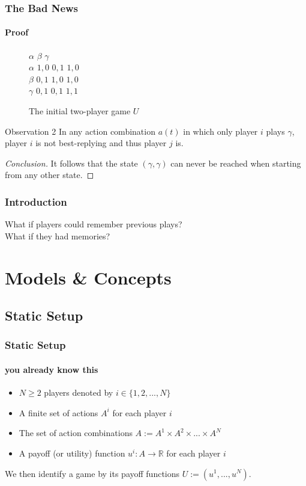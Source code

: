 \documentclass{beamer}
\begin{document}
\begin{frame}
    \frametitle{The Bad News}
    \framesubtitle{Proof}
    \vspace{-20pt}
    \begin{figure}[h]
    \centering
    \begin{game}{3}{3}
            \>  $\alpha$ \>  $\beta$  \> $\gamma$ \\
         $\alpha$    \>  $1, 0$ \> $0, 1$ \> $1,0$\\
         $\beta$      \>  $0, 1$ \> $1, 0$ \> $1, 0$\\
         $\gamma$ \>  $0, 1$ \> $0, 1$ \> $1, 1$\\
    \end{game}
    \caption{The initial two-player game $U$}
    \end{figure}
    \vspace{-10pt}
    \begin{exampleblock}{Observation 2}
        In any action combination $a(t)$ in which only player $i$ plays $\gamma$, player
        $i$ is not best-replying and thus player $j$ is.
    \end{exampleblock}
    \pause
    \begin{proof}[Conclusion]
        It follows that the state $(\gamma, \gamma)$ can
        never be reached when starting from any other state.
    \end{proof}
\end{frame}


\begin{frame}
    \frametitle{Introduction}
    \begin{center}
        What if players could remember previous plays?\\
        What if they had memories?
    \end{center}
\end{frame}

\section{Models \& Concepts}
\subsection{Static Setup}

\begin{frame}
    \frametitle{Static Setup}
    \framesubtitle{you already know this}
	\begin{definition}
		\begin{itemize}
			\item $N \geq 2$ players denoted by $i \in \{1, 2, ..., N\}$
			\item A finite set of actions $A^i$ for each player $i$
			\item The set of action combinations $A := A^1 \times A^2 \times ... \times A^N$
			\item A payoff (or utility) function $u^i : A \to \mathbb{R}$ for each
				player $i$
		\end{itemize}
		We then identify a game by its payoff functions $U := (u^1, ..., u^N)$.
	\end{definition}
\end{frame}
\end{document}
